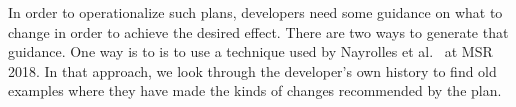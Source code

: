 \documentclass[10pt, journal, compsoc]{IEEEtran}
\begin{document}
In order to operationalize such plans, developers need some guidance on what to change in order to achieve the desired effect. 
There are two ways to generate that guidance.
One way is to is to use a technique
used by Nayrolles et al.~\cite{nayrolles2018clever} at MSR 2018. In that approach, we look through the developer's own history to find old examples where they have made the kinds of changes recommended by the plan. 
\end{document}
